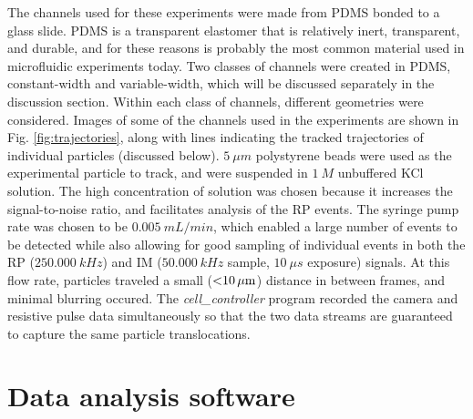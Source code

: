 		The channels used for these experiments were made from PDMS bonded to a glass slide. PDMS is a transparent elastomer that is relatively inert, transparent, and durable, and for these reasons is probably the most common material used in microfluidic experiments today. Two classes of channels were created in PDMS, constant-width and variable-width, which will be discussed separately in the discussion section. Within each class of channels, different geometries were considered. Images of some of the channels used in the experiments are shown in Fig. \ref{fig:trajectories}, along with lines indicating the tracked trajectories of individual particles (discussed below). $\SI{5}{\mu m}$ polystyrene beads were used as the experimental particle to track, and were suspended in $\SI{1}{M}$ unbuffered KCl solution. The high concentration of solution was chosen because it increases the signal-to-noise ratio, and facilitates analysis of the RP events. The syringe pump rate was chosen to be $\SI{0.005}{mL/min}$, which enabled a large number of events to be detected while also allowing for good sampling of individual events in both the RP ($\SI{250,000}{kHz}$) and IM ($\SI{50,000}{kHz}$ sample, $\SI{10}{\mu s}$ exposure) signals. At this flow rate, particles traveled a small ($\SI{<10}{\mu m}$) distance in between frames, and minimal blurring occured. The \textit{cell\_controller} program recorded the camera and resistive pulse data simultaneously so that the two data streams are guaranteed to capture the same particle translocations.
		
	\section{Data analysis software}
		
